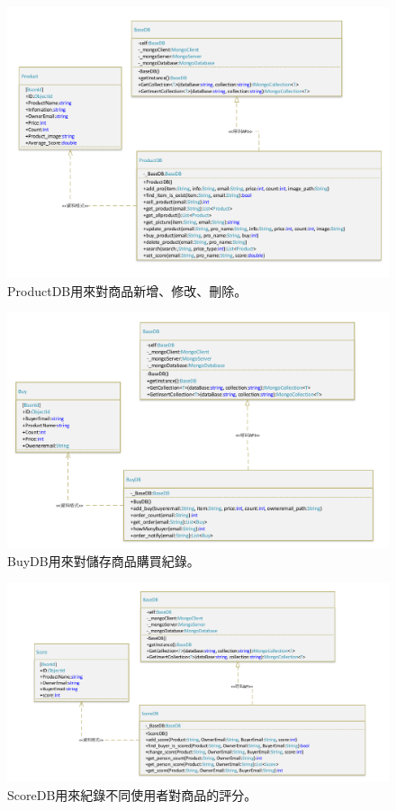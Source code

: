 \documentclass{scrreprt}
\begin{document}
\begin{CJK}{UTF8}{bkai}
\begin{figure}
	\includegraphics[width=\textwidth]{ProductDB.pdf}
	\caption{ProductDB用來對商品新增、修改、刪除。}
\end{figure}

\begin{figure}
	\includegraphics[width=\textwidth]{BuyDB.pdf}
	\caption{BuyDB用來對儲存商品購買紀錄。}
\end{figure}

\begin{figure}
	\includegraphics[width=\textwidth]{ScoreDB.pdf}
	\caption{ScoreDB用來紀錄不同使用者對商品的評分。}
\end{figure}


\end{CJK}
\end{document}
